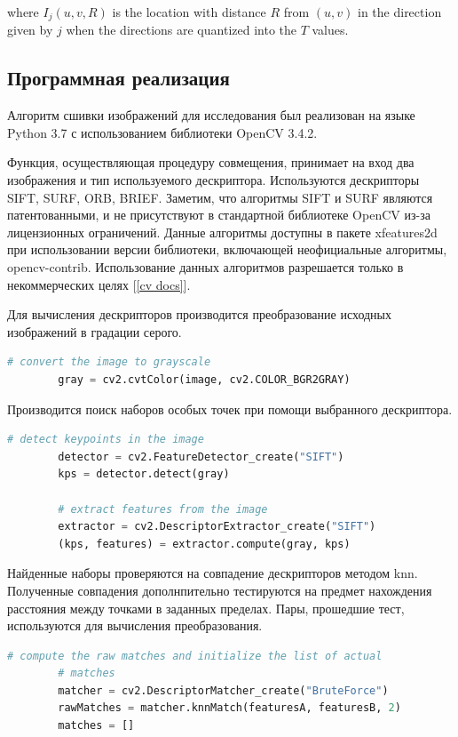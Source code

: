 {{{{		where $I_j(u, v, R)$ is the location with distance $R$ from $(u, v)$ in the direction given by $j$
		when the directions are quantized into the $T$ values.
	}
	\newpage
   	\subsection{Программная реализация}{
   		
   		Алгоритм сшивки изображений для исследования был реализован на языке Python 3.7 с использованием библиотеки OpenCV 3.4.2. 
   		
   		Функция, осуществляющая процедуру совмещения, принимает на вход два изображения и тип используемого дескриптора. 
   		Используются дескрипторы SIFT, SURF, ORB, BRIEF. Заметим, что алгоритмы SIFT и SURF являются патентованными, и не присутствуют в стандартной библиотеке OpenCV из-за лицензионных ограничений. Данные алгоритмы доступны в пакете xfeatures2d при использовании версии библиотеки, включающей неофициальные алгоритмы, opencv-contrib. Использование данных алгоритмов разрешается только в некоммерческих целях [\ref{cv docs}]. 
   		
   		Для вычисления дескрипторов производится преобразование исходных изображений в градации серого.
   		
   		\begin{lstlisting}[frame=single,language=Python,mathescape=true] 
   		# convert the image to grayscale
   		gray = cv2.cvtColor(image, cv2.COLOR_BGR2GRAY)
   		\end{lstlisting}
   		
   		Производится поиск наборов особых точек при помощи выбранного дескриптора.
   	
   		\begin{lstlisting}[frame=single,language=Python,mathescape=true] 
   		# detect keypoints in the image
   		detector = cv2.FeatureDetector_create("SIFT")
   		kps = detector.detect(gray)
   		
   		# extract features from the image
   		extractor = cv2.DescriptorExtractor_create("SIFT")
   		(kps, features) = extractor.compute(gray, kps)
   		\end{lstlisting}
   		
   		Найденные наборы проверяются на совпадение дескрипторов методом knn. Полученные совпадения дополнпительно тестируются на предмет нахождения расстояния между точками в заданных пределах. Пары, прошедшие тест, используются для вычисления преобразования.
   		
   		\begin{lstlisting}[frame=single,language=Python,mathescape=true] 
   		# compute the raw matches and initialize the list of actual
   		# matches
   		matcher = cv2.DescriptorMatcher_create("BruteForce")
   		rawMatches = matcher.knnMatch(featuresA, featuresB, 2)
   		matches = []
   		

\end{lstlisting}}}}}
